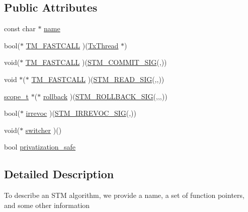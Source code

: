 \subsection*{Public Attributes}
\begin{DoxyCompactItemize}
\item 
const char $\ast$ \hyperlink{structstm_1_1alg__t_aef345627592649dbfc6f9266da8c4428}{name}
\item 
bool($\ast$ \hyperlink{structstm_1_1alg__t_a681b0b7426758442fa7dfba4dbc86b18}{T\-M\-\_\-\-F\-A\-S\-T\-C\-A\-L\-L} )(\hyperlink{structstm_1_1TxThread}{Tx\-Thread} $\ast$)
\item 
void($\ast$ \hyperlink{structstm_1_1alg__t_ae2a36e94732bda4c2f3e9bbadc870e3e}{T\-M\-\_\-\-F\-A\-S\-T\-C\-A\-L\-L} )(\hyperlink{include_2stm_2macros_8hpp_a1b8304eb1082517c7dc31f3534b72343}{S\-T\-M\-\_\-\-C\-O\-M\-M\-I\-T\-\_\-\-S\-I\-G}(,))
\item 
void $\ast$($\ast$ \hyperlink{structstm_1_1alg__t_ac0cd29ede0e01c3db48a2b189e6ecf76}{T\-M\-\_\-\-F\-A\-S\-T\-C\-A\-L\-L} )(\hyperlink{include_2stm_2macros_8hpp_abae784c2079f9c1ecc6a72cfeb795db4}{S\-T\-M\-\_\-\-R\-E\-A\-D\-\_\-\-S\-I\-G}(,,))
\item 
\hyperlink{namespacestm_a91badf88c88aacc831b01a315435a255}{scope\-\_\-t} $\ast$($\ast$ \hyperlink{structstm_1_1alg__t_a3238dd576cb31ed3eadeecd302c407ce}{rollback} )(\hyperlink{include_2stm_2macros_8hpp_a1c36a48149c84f90d5bca01019950ca9}{S\-T\-M\-\_\-\-R\-O\-L\-L\-B\-A\-C\-K\-\_\-\-S\-I\-G}(,,,))
\item 
bool($\ast$ \hyperlink{structstm_1_1alg__t_aabada7054a8c2ef801c80c308b800c3f}{irrevoc} )(\hyperlink{include_2stm_2macros_8hpp_acf117c2df6442342f6603e1a12fa3b5c}{S\-T\-M\-\_\-\-I\-R\-R\-E\-V\-O\-C\-\_\-\-S\-I\-G}(,))
\item 
void($\ast$ \hyperlink{structstm_1_1alg__t_ab76cab355e3c65c37a7ebd986b4e861b}{switcher} )()
\item 
bool \hyperlink{structstm_1_1alg__t_afc25cf5ba8df9237879431432b2a5bd0}{privatization\-\_\-safe}
\end{DoxyCompactItemize}


\subsection{Detailed Description}
To describe an S\-T\-M algorithm, we provide a name, a set of function pointers, and some other information 

